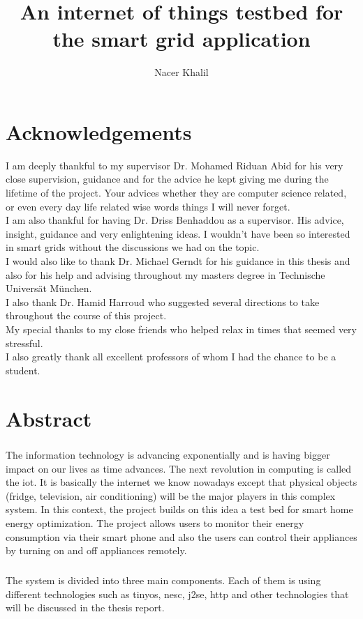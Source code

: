 \documentclass[oneside,12pt,a4paper,final]{book}
\author{Nacer Khalil}
\title{An internet of things testbed for the smart grid application}
\begin{document}
\doublespacing

\frontmatter



\chapter{Acknowledgements}
I am deeply thankful to my supervisor Dr. Mohamed Riduan Abid for his very close supervision, guidance and for the advice he kept giving me during the lifetime of the project. Your advices whether they are computer science related, or even every day life related wise words things I will never forget. 
\\
I am also thankful for having Dr. Driss Benhaddou as a supervisor. His advice, insight, guidance and very enlightening ideas. I wouldn't have been so interested in smart grids without the discussions we had on the topic.
\\
I would also like to thank Dr. Michael Gerndt for his guidance in this thesis and also for his help and advising throughout my masters degree in Technische Universät München.
\\
I  also thank Dr. Hamid Harroud who suggested several directions to take throughout the course of this project.
\\
My special thanks to my close friends who helped relax in times that seemed very stressful.
\\
I also greatly thank all excellent professors of whom I had the chance to be a student.



\chapter{Abstract}
\paragraph{}
The information technology is advancing exponentially and is having bigger impact on our lives as time advances. The next revolution in computing is called the \gls{iot}. It is basically the internet we know nowadays except that physical objects (fridge, television, air conditioning) will be the major players in this complex system. In this context, the project builds on this idea a test bed for smart home energy optimization. The project allows users to monitor their energy consumption via their smart phone and also the users can control their appliances by turning on and off appliances remotely.
\paragraph{}
The system is divided into three main components. Each of them is using different technologies such as \gls{tinyos}, \gls{nesc}, \gls{j2se}, \gls{http} and other technologies that will be discussed in the thesis report.
\end{document}
